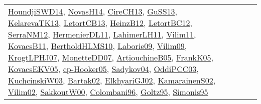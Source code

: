 {\begin{longtable}{llp{6cm}p{6cm}p{6cm}}
\href{papers/HoundjiSWD14.pdf}{HoundjiSWD14}\cite{HoundjiSWD14}, \href{articles/NovasH14.pdf}{NovasH14}\cite{NovasH14}, \href{papers/CireCH13.pdf}{CireCH13}\cite{CireCH13}, \href{papers/GuSS13.pdf}{GuSS13}\cite{GuSS13}, \href{papers/KelarevaTK13.pdf}{KelarevaTK13}\cite{KelarevaTK13}, \href{papers/LetortCB13.pdf}{LetortCB13}\cite{LetortCB13}, \href{papers/HeinzB12.pdf}{HeinzB12}\cite{HeinzB12}, \href{papers/LetortBC12.pdf}{LetortBC12}\cite{LetortBC12}, \href{papers/SerraNM12.pdf}{SerraNM12}\cite{SerraNM12}, \href{papers/HermenierDL11.pdf}{HermenierDL11}\cite{HermenierDL11}, \href{papers/LahimerLH11.pdf}{LahimerLH11}\cite{LahimerLH11}, \href{papers/Vilim11.pdf}{Vilim11}\cite{Vilim11}, \href{articles/KovacsB11.pdf}{KovacsB11}\cite{KovacsB11}, \href{papers/BertholdHLMS10.pdf}{BertholdHLMS10}\cite{BertholdHLMS10}, \href{papers/Laborie09.pdf}{Laborie09}\cite{Laborie09}, \href{papers/Vilim09.pdf}{Vilim09}\cite{Vilim09}, \href{papers/KrogtLPHJ07.pdf}{KrogtLPHJ07}\cite{KrogtLPHJ07}, \href{papers/MonetteDD07.pdf}{MonetteDD07}\cite{MonetteDD07}, \href{papers/ArtiouchineB05.pdf}{ArtiouchineB05}\cite{ArtiouchineB05}, \href{papers/FrankK05.pdf}{FrankK05}\cite{FrankK05}, \href{papers/KovacsEKV05.pdf}{KovacsEKV05}\cite{KovacsEKV05}, \href{papers/cp-Hooker05.pdf}{cp-Hooker05}\cite{cp-Hooker05}, \href{papers/Sadykov04.pdf}{Sadykov04}\cite{Sadykov04}, \href{papers/OddiPCC03.pdf}{OddiPCC03}\cite{OddiPCC03}, \href{articles/KuchcinskiW03.pdf}{KuchcinskiW03}\cite{KuchcinskiW03}, \href{papers/Bartak02.pdf}{Bartak02}\cite{Bartak02}, \href{papers/ElkhyariGJ02.pdf}{ElkhyariGJ02}\cite{ElkhyariGJ02}, \href{papers/KamarainenS02.pdf}{KamarainenS02}\cite{KamarainenS02}, \href{papers/Vilim02.pdf}{Vilim02}\cite{Vilim02}, \href{articles/SakkoutW00.pdf}{SakkoutW00}\cite{SakkoutW00}, \href{papers/Colombani96.pdf}{Colombani96}\cite{Colombani96}, \href{papers/Goltz95.pdf}{Goltz95}\cite{Goltz95}, \href{papers/Simonis95.pdf}{Simonis95}\cite{Simonis95}\\

\end{longtable}}

